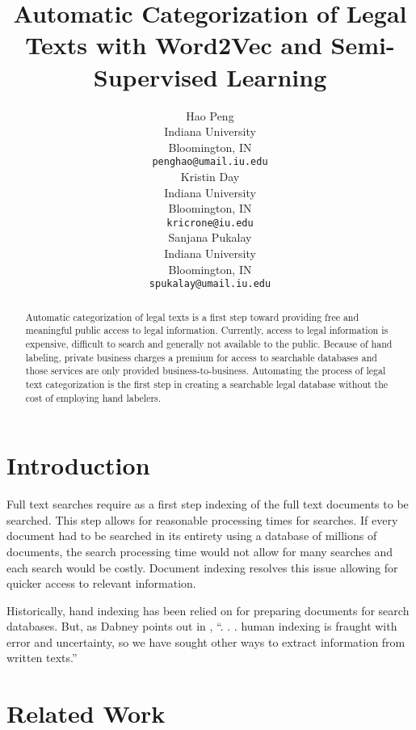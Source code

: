 \documentclass[11pt]{article}
\title{Automatic Categorization of Legal Texts with Word2Vec and Semi-Supervised Learning}
\author{Hao Peng \\
  Indiana University \\
  Bloomington, IN \\
  {\tt penghao@umail.iu.edu} \\\And
  Kristin Day \\
  Indiana University \\
  Bloomington, IN \\
  {\tt kricrone@iu.edu} \\\And
  Sanjana Pukalay \\
  Indiana University \\
  Bloomington, IN \\
  {\tt spukalay@umail.iu.edu} \\ }
\date{}
\begin{document}
\maketitle
\begin{abstract}
  Automatic categorization of legal texts is a first step toward providing free and meaningful public access to legal information.  Currently, access to legal information is expensive, difficult to search and generally not available to the public.  Because of hand labeling, private business charges a premium for access to searchable databases and those services are only provided business-to-business.  Automating the process of legal text categorization is the first step in creating a searchable legal database without the cost of employing hand labelers. 
\end{abstract}

\section{Introduction}
Full text searches require as a first step indexing of the full text documents to be searched.  This step allows for reasonable processing times for searches.  If every document had to be searched in its entirety using a database of millions of documents, the search processing time would not allow for many searches and each search would be costly.  Document indexing resolves this issue allowing for quicker access to relevant information.  

Historically, hand indexing has been relied on for preparing documents for search databases.  But, as Dabney points out in \cite[~p. 6]{Dabney}, ``. . . human indexing is fraught with error and uncertainty, so we have sought other ways to extract information from written texts.''  

\section{Related Work}
\end{document}
